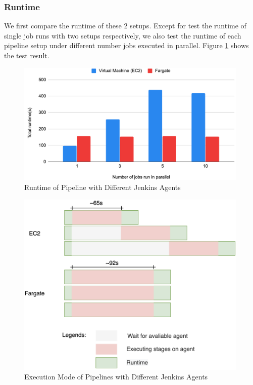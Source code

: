 \subsubsection{Runtime}
We first compare the runtime of these 2 setups. Except for test the runtime of single job runs with two setups respectively, we also test the runtime of each pipeline setup under different number jobs executed in parallel. Figure \ref{fig:runtime} shows the test result.
\begin{figure}[h]
\centering
\includegraphics[width=0.99\textwidth]{pics/runtime.png}
\caption{Runtime of Pipeline with Different Jenkins Agents}
\label{fig:runtime}
\end{figure}
\begin{figure}[h]
\centering
\includegraphics[width=0.99\textwidth]{pics/parallel.png}
\caption{Execution Mode of Pipelines with Different Jenkins Agents}
\label{fig:parallel}
\end{figure}
